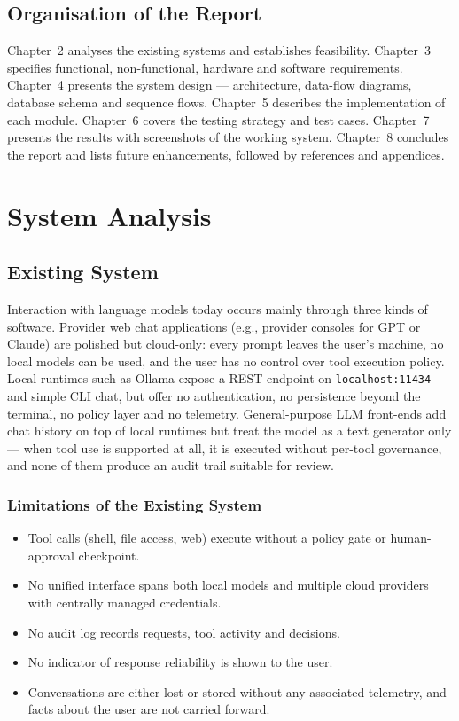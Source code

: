 \documentclass[12pt,a4paper,oneside]{report}
\begin{document}
\section{Organisation of the Report}
Chapter~2 analyses the existing systems and establishes feasibility.
Chapter~3 specifies functional, non-functional, hardware and software
requirements. Chapter~4 presents the system design --- architecture,
data-flow diagrams, database schema and sequence flows. Chapter~5
describes the implementation of each module. Chapter~6 covers the
testing strategy and test cases. Chapter~7 presents the results with
screenshots of the working system. Chapter~8 concludes the report and
lists future enhancements, followed by references and appendices.

\chapter{System Analysis}

\section{Existing System}
Interaction with language models today occurs mainly through three
kinds of software. Provider web chat applications (e.g., provider
consoles for GPT or Claude) are polished but cloud-only: every prompt
leaves the user's machine, no local models can be used, and the user
has no control over tool execution policy. Local runtimes such as
Ollama expose a REST endpoint on \texttt{localhost:11434} and simple
CLI chat, but offer no authentication, no persistence beyond the
terminal, no policy layer and no telemetry. General-purpose LLM
front-ends add chat history on top of local runtimes but treat the
model as a text generator only --- when tool use is supported at all,
it is executed without per-tool governance, and none of them produce
an audit trail suitable for review.

\subsection{Limitations of the Existing System}
\begin{itemize}
  \item Tool calls (shell, file access, web) execute without a policy
        gate or human-approval checkpoint.
  \item No unified interface spans both local models and multiple
        cloud providers with centrally managed credentials.
  \item No audit log records requests, tool activity and decisions.
  \item No indicator of response reliability is shown to the user.
  \item Conversations are either lost or stored without any associated
        telemetry, and facts about the user are not carried forward.
\end{itemize}
\end{document}
